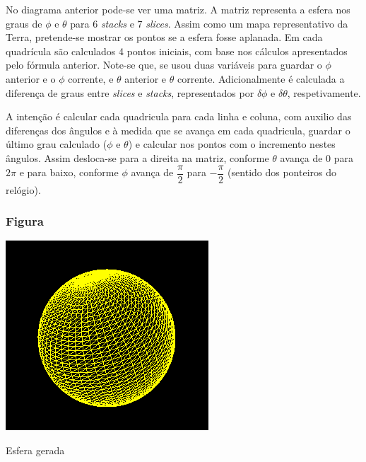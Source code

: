 No diagrama anterior pode-se ver uma matriz. A matriz representa a esfera nos graus de $\phi$ e $\theta$ para 6 \emph{stacks} e 7 \emph{slices}. Assim como um mapa representativo da Terra, pretende-se mostrar os pontos se a esfera fosse aplanada. 
Em cada quadrícula são calculados 4 pontos iniciais, com base nos cálculos apresentados pelo fórmula anterior. Note-se que, se usou duas variáveis para guardar o $\phi$ anterior e o $\phi$ corrente, e $\theta$ anterior  e $\theta$ corrente. Adicionalmente é calculada a diferença de graus entre \emph{slices} e \emph{stacks}, representados por $\delta \phi$ e $\delta \theta$, respetivamente. 

A intenção é calcular cada quadricula para cada linha e coluna, com auxilio das diferenças dos ângulos e à medida que se avança em cada quadricula, guardar o último grau calculado ($\phi$ e $\theta$) e calcular nos pontos com o incremento nestes ângulos. Assim desloca-se para a direita na matriz, conforme $\theta$ avança de 0 para $2\pi$ e para baixo, conforme $\phi$ avança de $\dfrac{\pi}{2}$ para $-\dfrac{\pi}{2}$ (sentido dos ponteiros do relógio).




\subsubsection{Figura}
\begin{center}
 	
 	\includegraphics[width=\textwidth,height=\textheight,keepaspectratio]{resources/sphere.png}
 	\captionsetup{type=figure, width=0.8\linewidth}
	\caption{Esfera gerada}
\label{fig:ssec1:sphere} 
\end{center}
\newpage


